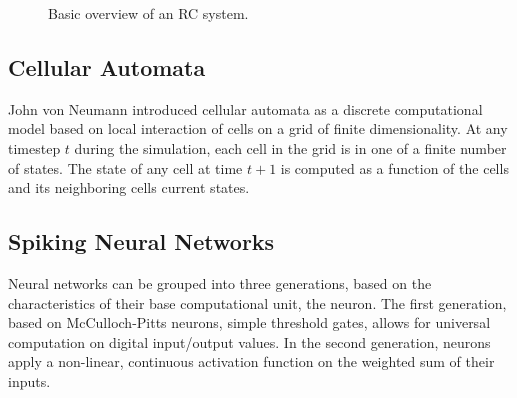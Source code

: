 \begin{figure}
  \centering
  \caption{Basic overview of an RC system.}
\label{fig:rc-system}
\end{figure}

\subsection{Cellular Automata}

John von Neumann introduced cellular automata as a discrete computational model based on local interaction of cells on a grid of finite dimensionality. 
At any timestep $t$ during the simulation, each cell in the grid is in one of a finite number of states.
The state of any cell at time $t+1$ is computed as a function of the cells and its neighboring cells current states.



\subsection{Spiking Neural Networks}

Neural networks can be grouped into three generations, based on the characteristics of their base computational unit, the neuron.
The first generation, based on McCulloch-Pitts neurons, simple threshold gates, allows for universal computation on digital input/output values.
In the second generation, neurons apply a non-linear, continuous activation function on the weighted sum of their inputs.

